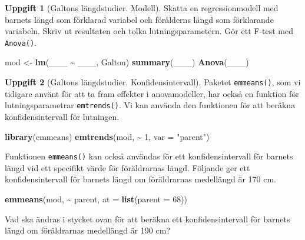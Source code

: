 \documentclass[
]{book}
\newenvironment{Shaded}{\begin{snugshade}}{\end{snugshade}}
\newcommand{\AttributeTok}[1]{\textcolor[rgb]{0.13,0.29,0.53}{#1}}
\newcommand{\DecValTok}[1]{\textcolor[rgb]{0.00,0.00,0.81}{#1}}
\newcommand{\FunctionTok}[1]{\textcolor[rgb]{0.13,0.29,0.53}{\textbf{#1}}}
\newcommand{\NormalTok}[1]{#1}
\newcommand{\OtherTok}[1]{\textcolor[rgb]{0.56,0.35,0.01}{#1}}
\newcommand{\SpecialCharTok}[1]{\textcolor[rgb]{0.81,0.36,0.00}{\textbf{#1}}}
\newcommand{\StringTok}[1]{\textcolor[rgb]{0.31,0.60,0.02}{#1}}
\theoremstyle{definition}
\theoremstyle{definition}
\theoremstyle{definition}
\newtheorem{exercise}{Uppgift}[chapter]
\theoremstyle{definition}
\theoremstyle{remark}
\begin{document}
\begin{exercise}[Galtons längdstudier. Modell]

Skatta en regressionmodell med barnets längd som förklarad variabel och förälderns längd som förklarande variabeln. Skriv ut resultaten och tolka lutningsparametern. Gör ett F-test med \texttt{Anova()}.

\begin{Shaded}
\begin{Highlighting}[]
\NormalTok{mod }\OtherTok{\textless{}{-}} \FunctionTok{lm}\NormalTok{(\_\_\_ }\SpecialCharTok{\textasciitilde{}}\NormalTok{ \_\_\_, Galton)}
\FunctionTok{summary}\NormalTok{(\_\_\_)}
\FunctionTok{Anova}\NormalTok{(\_\_\_)}
\end{Highlighting}
\end{Shaded}

\end{exercise}

\begin{exercise}[Galtons längdstudier. Konfidensintervall]
Paketet \texttt{emmeans()}, som vi tidigare använt för att ta fram effekter i anovamodeller, har också en funktion för lutningsparametrar \texttt{emtrends()}. Vi kan använda den funktionen för att beräkna konfidensintervall för lutningen.

\begin{Shaded}
\begin{Highlighting}[]
\FunctionTok{library}\NormalTok{(emmeans)}
\FunctionTok{emtrends}\NormalTok{(mod, }\SpecialCharTok{\textasciitilde{}} \DecValTok{1}\NormalTok{, }\AttributeTok{var =} \StringTok{"parent"}\NormalTok{)}
\end{Highlighting}
\end{Shaded}

Funktionen \texttt{emmeans()} kan också användas för ett konfidensintervall för barnets längd vid ett specifikt värde för föräldrarnas längd. Följande ger ett konfidensintervall för barnets längd om föräldrarnas medellängd är 170 cm.

\begin{Shaded}
\begin{Highlighting}[]
\FunctionTok{emmeans}\NormalTok{(mod, }\SpecialCharTok{\textasciitilde{}}\NormalTok{ parent, }\AttributeTok{at =} \FunctionTok{list}\NormalTok{(}\AttributeTok{parent =} \DecValTok{68}\NormalTok{))}
\end{Highlighting}
\end{Shaded}

Vad ska ändras i stycket ovan för att beräkna ett konfidensintervall för barnets längd om föräldrarnas medellängd är 190 cm?
\end{exercise}
\end{document}
